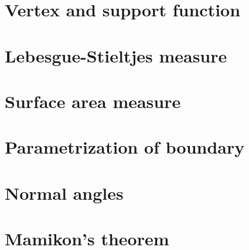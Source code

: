 
\section{Vertex and support function}
\label{sec:vertex-and-support-function}


\section{Lebesgue-Stieltjes measure}
\label{sec:lebesgue-stieltjes-measure}


\section{Surface area measure}
\label{sec:surface-area-measure}


\section{Parametrization of boundary}
\label{sec:parametrization-of-boundary}


\section{Normal angles}
\label{sec:normal-angles}


\section{Mamikon's theorem}
\label{sec:mamikon's-theorem}


